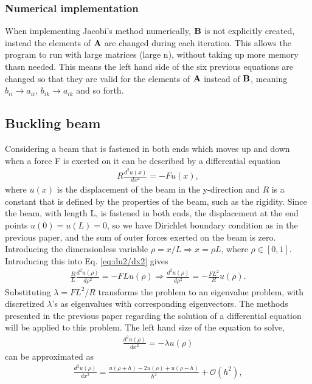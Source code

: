 \documentclass{emulateapj}
\begin{document}
 
\subsubsection{Numerical implementation}
When implementing Jacobi's method numerically, $\bold{B}$ is not explicitly created, instead the elements of $\bold{A}$ are changed during each iteration. This allows the program to run with large matrices (large n), without taking up more memory thasn needed. This means the left hand side of the six previous equations are changed so that they are valid for the elements of $\bold{A}$ instead of $\bold{B}$, meaning $b_{ii} \rightarrow a_{ii}$, $b_{ik} \rightarrow a_{ik}$ and so forth.

\subsection{Buckling beam}
Considering a beam that is fastened in both ends which moves up and down when a force F is exerted on it can be described by a differential equation
%
\begin{gather}\label{eq:du2/dx2}
    R \frac{d^2 u(x)}{dx^2} = -Fu(x),
\end{gather}
%
where $u(x)$ is the displacement of the beam in the y-direction and $R$ is a constant that is defined by the properties of the beam, such as the rigidity. Since the beam, with length L, is fastened in both ends, the displacement at the end points $u(0) = u(L) = 0$, so we have Dirichlet boundary condition as in the previous paper, and the sum of outer forces exerted on the beam is zero. Introducing the dimensionless variable $\rho = x/L \Rightarrow x = \rho L$, where $\rho \in [0,1]$. Introducing this into Eq. \eqref{eq:du2/dx2} gives
%
\begin{gather*}
    \frac{R}{L}\frac{d^2 u(\rho)}{d\rho^2} = - FLu(\rho)
    \Rightarrow \frac{d^2 u(\rho)}{d\rho^2} = -\frac{FL^2}{R}u(\rho).
\end{gather*}
%
Substituting $\lambda = FL^2/R$ transforms the problem to an eigenvalue problem, with discretized $\lambda$'s as eigenvalues with corresponding eigenvectors. The methods presented in the previous paper regarding the solution of a differential equation will be applied to this problem. The left hand size of the equation to solve,
%
\begin{gather}\label{eq:du/dx=lambda}
    \frac{d^2 u(\rho)}{dx^2} = -\lambda u(\rho)
\end{gather}
%
can be approximated as
%
\begin{gather*}
    \frac{d^2 u(\rho)}{dx^2} = \frac{u(\rho + h) - 2u(\rho) + u(\rho - h)}{h^2} +  \mathcal{O}(h^2),
\end{gather*}
\end{document}
